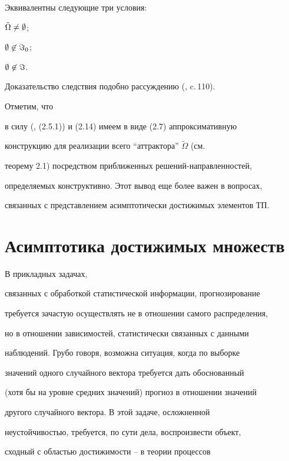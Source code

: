 \begin{cornonum} Эквивалентны следующие три условия:


$\tilde\Omega \ne\emptyset$;


$\emptyset \not\in \Im_0$;


$\emptyset \not\in \Im$.


\end{cornonum}





Доказательство следствия подобно рассуждению (\cite{Ch1}, c.\,110).


Отметим, что


в силу (\cite{Ch1}, (2.5.1)) и (2.14) имеем в виде (2.7) аппроксимативную


конструкцию для реализации всего ``аттрактора'' $\tilde\Omega$ (см.


теорему 2.1) посредством приближенных решений-направленностей,


определяемых конструктивно. Этот вывод еще более важен в вопросах,


связанных с представлением асимптотически достижимых элементов ТП.





\section{Асимптотика достижимых множеств}





В прикладных задачах,


связанных с обработкой статистической информации, прогнозирование


требуется зачастую осуществлять не в отношении самого распределения,


но в отношении зависимостей, статистически связанных с данными


наблюдений. Грубо говоря, возможна ситуация, когда по выборке


значений одного случайного вектора требуется дать обоснованный


(хотя бы на уровне средних значений) прогноз в отношении значений


другого случайного вектора. В этой задаче, осложненной


неустойчивостью, требуется, по сути дела, воспроизвести объект,


сходный с областью достижимости \cite{Kra1}--\cite{Pan} в теории процессов


